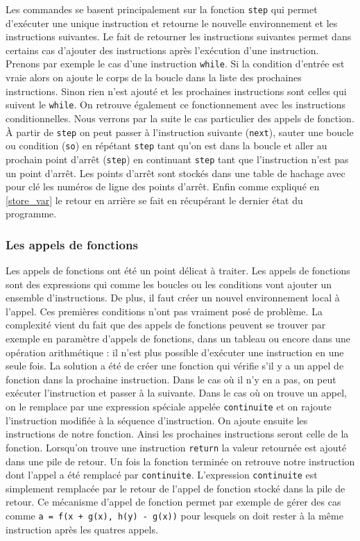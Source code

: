 \documentclass{article}
\begin{document}
Les commandes se basent principalement sur la fonction \verb|step| qui permet d'exécuter une 
unique instruction et retourne le nouvelle environnement et les instructions suivantes.
Le fait de retourner les instructions suivantes permet dans certains cas d'ajouter des 
instructions après l'exécution d'une instruction. Prenons par exemple le cas d'une instruction 
\verb|while|. Si la condition d'entrée est vraie alors on ajoute le corps de la boucle dans la 
liste des prochaines instructions. Sinon rien n'est ajouté et les prochaines instructions sont 
celles qui suivent le \verb|while|. On retrouve également ce fonctionnement avec les instructions 
conditionnelles. Nous verrons par la suite le cas particulier des appels de fonction.
À partir de \verb|step| on peut passer à l'instruction suivante (\verb|next|), sauter une boucle ou 
condition (\verb|so|) en répétant \verb|step| tant qu'on est dans la boucle et aller au prochain 
point d'arrêt (\verb|step|) en continuant \verb|step| tant que l'instruction n'est pas un point d'arrêt.
Les points d'arrêt sont stockés dans une table de hachage avec pour clé les numéros de ligne des points 
d'arrêt. Enfin comme expliqué en \ref{store_var} le retour en arrière se fait en récupérant le 
dernier état du programme.

\subsubsection{Les appels de fonctions}
Les appels de fonctions ont été un point délicat à traiter. Les appels de fonctions 
sont des expressions qui comme les boucles ou les conditions vont ajouter un ensemble 
d'instructions. De plus, il faut créer un nouvel environnement local à l'appel. Ces 
premières conditions n'ont pas vraiment posé de problème. La complexité vient du fait 
que des appels de fonctions peuvent se trouver par exemple en paramètre d'appels de 
fonctions, dans un tableau ou encore dans une opération arithmétique : il n'est 
plus possible d'exécuter une instruction en une seule fois. La solution a été de créer 
une fonction qui vérifie s'il y a un appel de fonction dans la prochaine instruction.
Dans le cas où il n'y en a pas, on peut exécuter l'instruction et passer à la suivante.
Dans le cas où on trouve un appel, on le remplace par une expression 
spéciale appelée \verb|continuite| et on rajoute l'instruction modifiée à la séquence 
d'instruction. On ajoute ensuite les instructions de notre fonction. Ainsi les 
prochaines instructions seront celle de la fonction. Lorsqu'on trouve une instruction 
\verb|return| la valeur retournée est ajouté dans une pile de retour. Un fois la 
fonction terminée on retrouve notre instruction dont l'appel a été remplacé par 
\verb|continuite|. L'expression \verb|continuite| est simplement remplacée par le 
retour de l'appel de fonction stocké dans la pile de retour. Ce mécanisme d'appel 
de fonction permet par exemple de gérer des cas comme \verb|a = f(x + g(x), h(y) - g(x))|
pour lesquels on doit rester à la même instruction après les quatres appels. 
\end{document}
